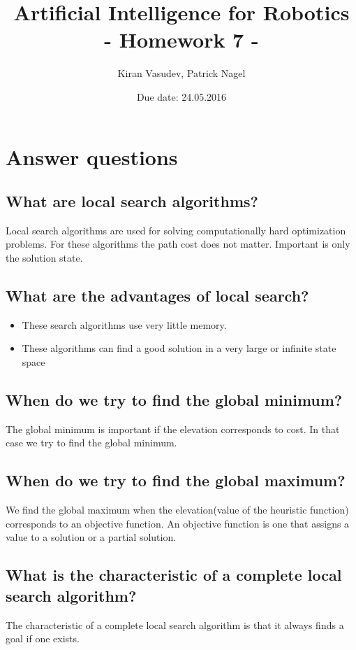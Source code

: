 \documentclass[11pt]{article}
\title{\textbf{Artificial Intelligence for Robotics\\ - Homework 7 -}}
\author{Kiran Vasudev, Patrick Nagel}
\date{Due date: 24.05.2016}
\begin{document}
\maketitle

\newpage
\tableofcontents

\newpage
\section{Answer questions}
\subsection{What are local search algorithms?}
Local search algorithms are used for solving computationally hard optimization problems. For these algorithms the path cost does not matter. Important is only the solution state.
\subsection{What are the advantages of local search?}
\begin{itemize}
\item {These search algorithms use very little memory.}
\item {These algorithms can find a good solution in a very large or infinite state space}
\end{itemize}

\subsection{When do we try to find the global minimum?}
The global minimum is important if the elevation corresponds to cost. In that case we try to find the global minimum. 

\subsection{When do we try to find the global maximum?}
We find the global maximum when the elevation(value of the heuristic function) corresponds to an objective function. An objective function is one that assigns a value to a solution or a partial solution.

\subsection{What is the characteristic of a complete local search algorithm?}
The characteristic of a complete local search algorithm is that it always finds a goal if one exists.
\end{document}
